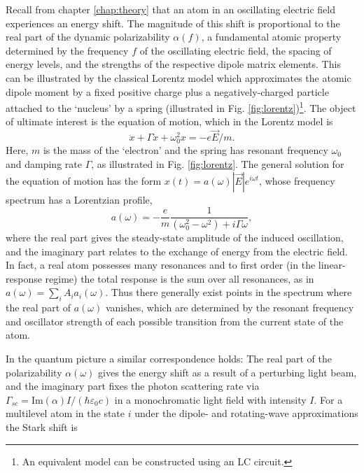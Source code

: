 	Recall from chapter \ref{chap:theory} that an atom in an oscillating electric field experiences an energy shift.
	The magnitude of this shift is proportional to the real part of the dynamic polarizability $\alpha(f)$, a fundamental atomic property determined by the frequency $f$ of the oscillating electric field, the spacing of energy levels, and the strengths of the respective dipole matrix elements.
	This can be illustrated by the classical Lorentz model which approximates the atomic dipole moment by a fixed positive charge plus a negatively-charged particle attached to the `nucleus' by a spring (illustrated in Fig. \ref{fig:lorentz})\footnote{An equivalent model can be constructed using an LC circuit.}.
	The object of ultimate interest is the equation of motion, which in the Lorentz model is 
	\begin{equation}
		\ddot{x} + \Gamma \dot{x} + \omega_0^2x = -e\vec{E}/m.
	\end{equation}
	Here, $m$ is the mass of the `electron' and the spring has resonant frequency $\omega_0$ and damping rate $\Gamma$, as illustrated in Fig. \ref{fig:lorentz}.
	The general solution for the equation of motion has the form $x(t) = a(\omega)|\vec{E}|e^{i\omega t}$, whose frequency spectrum has a Lorentzian profile,
	\begin{equation}
		a(\omega) = -\frac{e}{m}\frac{1}{(\omega_0^2-\omega^2)+i\Gamma\omega},
	\end{equation}
	where the real part gives the steady-state amplitude of the induced oscillation, and the imaginary part relates to the exchange of energy from the electric field.
	In fact, a real atom possesses many resonances and to first order (in the linear-response regime) the total response is the sum over all resonances, as in $a(\omega) = \sum_i A_i a_i(\omega)$. 
	Thus there generally exist points in the spectrum where the real part of $a(\omega)$ vanishes, which are determined by the resonant frequency and oscillator strength of each possible transition from the current state of the atom.
	
	In the quantum picture a similar correspondence holds: The real part of the polarizability $\alpha(\omega)$ gives the energy shift as a result of a perturbing light beam, and the imaginary part fixes the photon scattering rate  via $\Gamma_{sc} = \textrm{Im}(\alpha)I/(\hbar\varepsilon_0 c)$ in a monochromatic light field with intensity $I$. 
	For a multilevel atom in the state $i$ under the dipole- and rotating-wave approximations \cite{Grimm00} the Stark shift is
	
